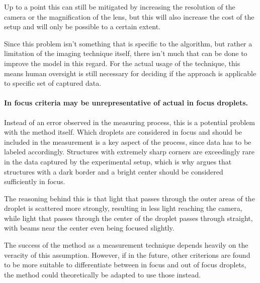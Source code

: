 Up to a point this can still be mitigated by increasing the resolution of the camera or the magnification of the lens, but this will also increase the cost of the setup and will only be possible to a certain extent.

Since this problem isn't something that is specific to the algorithm, but rather a limitation of the imaging technique itself, there isn't much that can be done to improve the model in this regard.
For the actual usage of the technique, this means human oversight is still necessary for deciding if the approach is applicable to specific set of captured data.

\paragraph{In focus criteria may be unrepresentative of actual in focus droplets.} Instead of an error observed in the measuring process, this is a potential problem with the method itself.
Which droplets are considered in focus and should be included in the measurement is a key aspect of the process, since data has to be labeled accordingly. Structures with extremely sharp corners are exceedingly rare in the data captured by the experimental setup, which is why \cite{kapplAkustischInduzierteVernebelung2022} argues that structures with a dark border and a bright center should be considered sufficiently in focus.

The reasoning behind this is that light that passes through the outer areas of the droplet is scattered more strongly, resulting in less light reaching the camera, while light that passes through the center of the droplet passes through straight, with beams near the center even being focused slightly.

The success of the method as a measurement technique depends heavily on the veracity of this assumption. 
However, if in the future, other criterions are found to be more suitable to differentiate between in focus and out of focus droplets, the method could theoretically be adapted to use those instead.